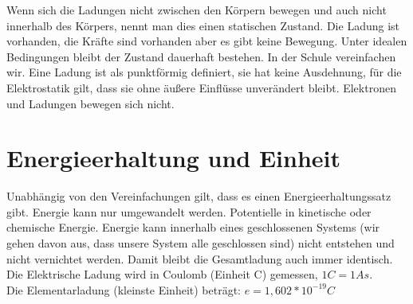 \documentclass[a4paper, 10pt]{scrartcl}
\begin{document}
Wenn sich die Ladungen nicht zwischen den Körpern bewegen und auch nicht innerhalb des Körpers, nennt man dies einen statischen Zustand. Die Ladung ist vorhanden, die Kräfte sind vorhanden aber es gibt keine Bewegung. Unter idealen Bedingungen bleibt der Zustand dauerhaft bestehen. In der Schule vereinfachen wir. Eine Ladung ist als punktförmig definiert, sie hat keine Ausdehnung, für die Elektrostatik gilt, dass sie ohne äußere Einflüsse unverändert bleibt. Elektronen und Ladungen bewegen sich nicht.

\section[Einheiten]{Energieerhaltung und Einheit}

Unabhängig von den Vereinfachungen gilt, dass es einen Energieerhaltungssatz gibt. Energie kann nur umgewandelt werden. Potentielle in kinetische oder chemische Energie. Energie kann innerhalb eines geschlossenen Systems (wir gehen davon aus, dass unsere System alle geschlossen sind) nicht entstehen und nicht vernichtet werden. Damit bleibt die Gesamtladung auch immer identisch. Die Elektrische Ladung wird in Coulomb (Einheit C) gemessen, $1 C = 1 As$. \\ Die Elementarladung (kleinste Einheit) beträgt: $e = 1,602 * 10^{-19} C$
\end{document}
